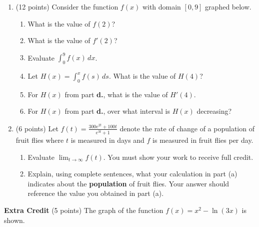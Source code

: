 \documentclass[12pt]{article}
\let\ds\displaystyle
\begin{document}
\begin{enumerate}
\newpage
\item (12 points) Consider the function $f(x)$ with domain $[0,9]$ graphed below. 

\begin{center}
\end{center}

\bigskip
\begin{enumerate}
\item What is the value of $f(2)$?

\vfill

\item  What is the value of $f'(2)$?

\vfill

\item  Evaluate $\displaystyle \int_{0}^{9} f(x)\,dx$.

\vfill

\item Let $H(x) =\ds \int_0^x f(s)\,ds$.  What is the value of $H(4)$?

\vfill

\item  For $H(x)$ from part \textbf{d.}, what is the value of $H'(4)$.

\vfill

\item For $H(x)$ from part \textbf{d.}, over what interval is $H(x)$ decreasing?
\vfill
\end{enumerate}

\newpage
\item (6 points) Let $\displaystyle f(t)= \frac{300e^{2t}+100t}{e^{3t} +1}$ denote the rate of change of a population of fruit flies where $t$ is measured in days and $f$ is measured in fruit flies per day.\\
\begin{enumerate}
\item Evaluate $\displaystyle \lim_{t \to \infty} f(t).$ You must show your work to receive full credit.
\vfill
\item Explain, using complete sentences, what your calculation in part (a) indicates about the \textbf{population} of fruit flies. Your answer should reference the value you obtained in part (a).
\vfill
\end{enumerate}
\end{enumerate}
\newpage
\textbf{Extra Credit} (5 points) The graph of the function $f(x)=x^2-\ln(3x)$ is shown.
\end{document}
